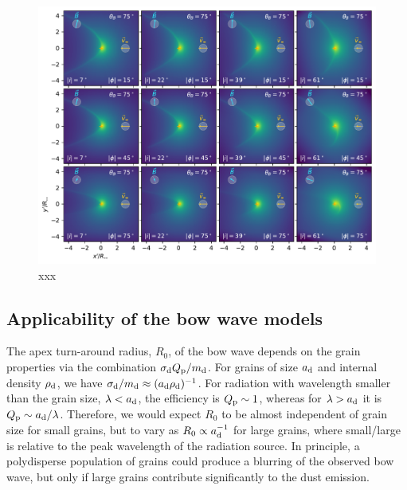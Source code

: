 \begin{figure}
  \includegraphics[width=\linewidth]{figs/multi-view-dust-bfield-75}
  \caption{xxx}
  \label{fig:projected-magnetic-dust-waves-75}
\end{figure}


\subsection{Applicability of the bow wave models}
\label{sec:dust-applicability}

The apex turn-around radius, \(R_0\), of the bow wave depends on the
grain properties via the combination \(\sigma_{\text{d}} Q_{\text{p}} / m_{\text{d}}\).  For
grains of size \(a_{\text{d}}\) and internal density \(\rho_{\text{d}}\), we have
\(\sigma_{\text{d}} / m_{\text{d}} \approx (a_{\text{d}} \rho_{\text{d}})^{-1}\).  For radiation with
wavelength smaller than the grain size, \(\lambda < a_{\text{d}}\), the
efficiency is \(Q_{\text{p}} \sim 1\), whereas for \(\lambda > a_{\text{d}}\) it is
\(Q_{\text{p}} \sim a_{\text{d}}/\lambda\).  Therefore, we would expect \(R_0\) to be almost
independent of grain size for small grains, but to vary as
\(R_0 \propto a_{\text{d}}^{-1}\) for large grains, where small/large is relative
to the peak wavelength of the radiation source.  In principle, a
polydisperse population of grains could produce a blurring of the
observed bow wave, but only if large grains contribute significantly
to the dust emission.





